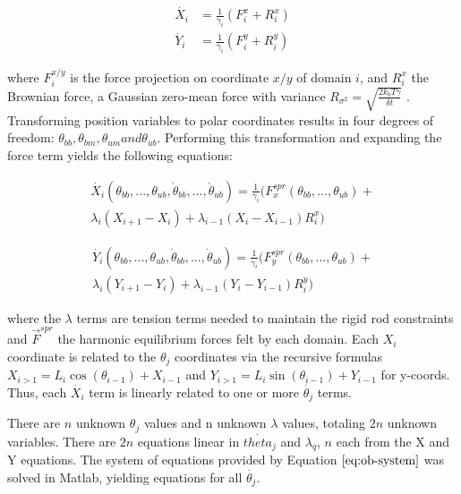 \documentclass[9pt,twocolumn,twoside]{article}
\begin{document}
  \begin{align}
    \dot{X_i} &= \frac{1}{\gamma_i}\left(F^x_i + R^x_i\right)\\
    \dot{Y_i} &= \frac{1}{\gamma_i}\left(F^y_i + R^y_i\right)
  \end{align}

  where $F^{x/y}_i$ is the force projection on coordinate $x/y$ of domain $i$, and $R^x_i$ the Brownian force, a Gaussian zero-mean force with variance $R_{\sigma^2} = \sqrt{\frac{2k_bT\gamma}{\delta t}}$ \cite{einstein}. Transforming position variables to polar coordinates results in four degrees of freedom: $\theta_{bb}, \theta_{bm}, \theta_{um} and \theta_{ub}$. Performing this transformation and expanding the force term yields the following equations:

  \begin{multline}
    \dot{X_i}\left(\theta_{bb}, ..., \theta_{ub}, \dot{\theta}_{bb}, ..., \dot{\theta}_{ub}\right) = \frac{1}{\gamma_i}\big(F^{spr}_x(\theta_{bb}, ..., \theta_{ub}) + \\
    \lambda_i\left(X_{i+1}-X_i\right) + \lambda_{i-1}\left(X_i-X_{i-1}\right)R^x_i\big)
    \label{eq:ob-system}
  \end{multline}

  \begin{multline}
    \dot{Y_i}\left(\theta_{bb}, ..., \theta_{ub}, \dot{\theta}_{bb}, ..., \dot{\theta}_{ub}\right) = \frac{1}{\gamma_i}\big(F^{spr}_y(\theta_{bb}, ..., \theta_{ub}) + \\
    \lambda_i\left(Y_{i+1}-Y_i\right) + \lambda_{i-1}\left(Y_i-Y_{i-1}\right)R^y_i\big)
    \label{eq:ob-system-other}
  \end{multline}

  where the $\lambda$ terms are tension terms needed to maintain the rigid rod constraints and $\vec{F}^{spr}$ the harmonic equilibrium forces felt by each domain. Each $X_i$ coordinate is related to the $\theta_j$ coordinates via the recursive formulas $X_{i>1} = L_i\cos(\theta_{i-1})+X_{i-1}$ and $Y_{i>1} = L_i\sin(\theta_{i-1})+Y_{i-1}$ for y-coords. Thus, each $\dot{X_i}$ term is linearly related to one or more $\dot{\theta_j}$ terms.

  There are $n$ unknown $\theta_j$ values and n unknown $\lambda$ values, totaling $2n$ unknown variables. There are $2n$ equations linear in $\dot{theta_j}$ and $\lambda_q$, $n$ each from the X and Y equations. The system of equations provided by Equation $\ref{eq:ob-system}$ was solved in Matlab, yielding equations for all $\dot{\theta_j}$.
\end{document}

